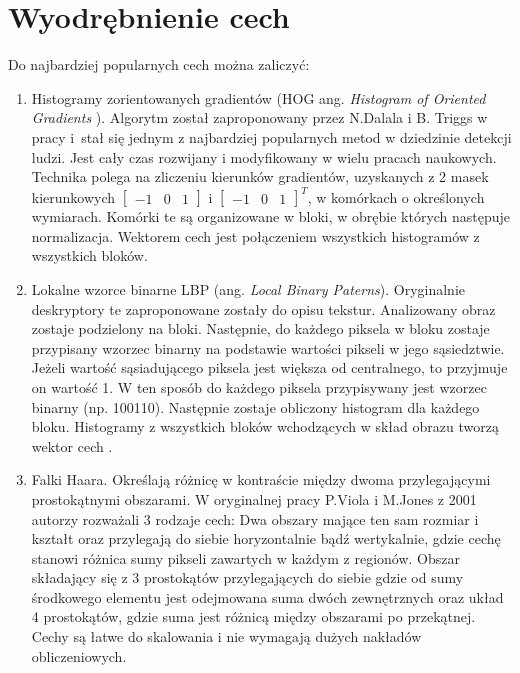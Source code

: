 
\section{Wyodrębnienie cech}

Do najbardziej popularnych cech można zaliczyć:

\begin{enumerate}
\item Histogramy zorientowanych gradientów (HOG ang. \textit{Histogram of Oriented Gradients }). %
Algorytm został zaproponowany przez N.Dalala i B. Triggs w pracy \cite{dalal2005histograms} i~stał się jednym z najbardziej popularnych metod w dziedzinie detekcji ludzi. %
Jest cały czas rozwijany i modyfikowany w wielu pracach naukowych.
Technika polega na zliczeniu kierunków gradientów, uzyskanych z 2 masek kierunkowych \(\begin{bmatrix}-1 & 0 & 1\end{bmatrix} \) i \( \begin{bmatrix}-1 & 0 & 1 \end{bmatrix}^T\), w komórkach o określonych wymiarach.
Komórki te są organizowane w bloki, w obrębie których następuje normalizacja.
Wektorem cech jest połączeniem wszystkich histogramów z wszystkich bloków.


\item Lokalne wzorce binarne LBP (ang. \textit{Local Binary Paterns}).
Oryginalnie deskryptory te zaproponowane zostały do opisu tekstur. %
Analizowany obraz zostaje podzielony na bloki.
Następnie, do każdego piksela w bloku zostaje przypisany wzorzec binarny na podstawie wartości pikseli w jego sąsiedztwie.
Jeżeli wartość sąsiadującego piksela jest większa od centralnego, to przyjmuje on wartość 1. W ten sposób do każdego piksela przypisywany jest wzorzec binarny (np. 100110).
Następnie zostaje obliczony histogram dla każdego bloku.
Histogramy z wszystkich bloków wchodzących w skład obrazu tworzą wektor cech \cite{ojala2002multiresolution}.

\item Falki Haara.
Określają różnicę w kontraście między dwoma przylegającymi prostokątnymi obszarami. W oryginalnej pracy P.Viola i M.Jones z 2001 \cite{viola2001rapid} autorzy rozważali 3 rodzaje cech: Dwa obszary mające ten sam rozmiar i kształt oraz przylegają do siebie horyzontalnie bądź wertykalnie, gdzie cechę stanowi różnica sumy pikseli zawartych w każdym z regionów. Obszar składający się z 3 prostokątów przylegających do siebie gdzie od sumy środkowego elementu jest odejmowana suma dwóch zewnętrznych oraz układ 4 prostokątów, gdzie suma jest różnicą między obszarami po przekątnej.
Cechy są łatwe do skalowania i nie wymagają dużych nakładów obliczeniowych.


\end{enumerate}
